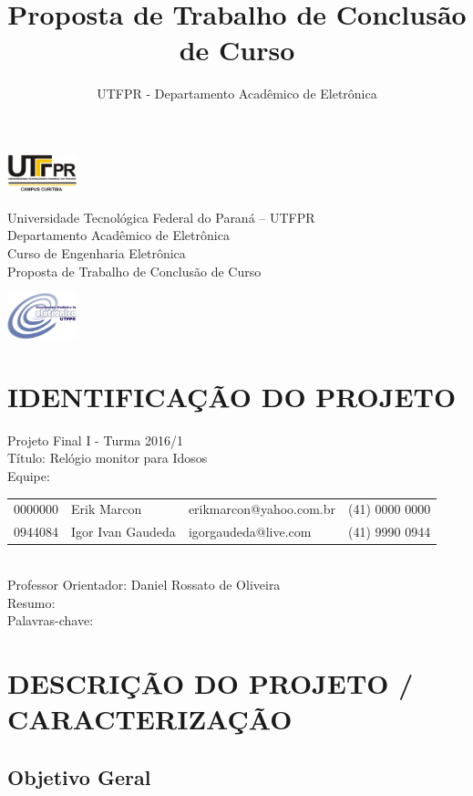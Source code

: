 \documentclass[a4paper]{article}
\title{Proposta de Trabalho de Conclusão de Curso}
\author{UTFPR - Departamento Acadêmico de Eletrônica}
\date{\the\year}
\begin{document}
\noindent
\includegraphics[width=0.15\textwidth]{figuras/UTFPR.png}
\begin{minipage}[b]{0.7\textwidth}
\centering
\Large{
Universidade Tecnológica Federal do Paraná – UTFPR\\
Departamento Acadêmico de Eletrônica\\
Curso de Engenharia Eletrônica \\
Proposta de Trabalho de Conclusão de Curso}
\end{minipage}
\includegraphics[width=0.15\textwidth]{figuras/daeln.jpg}

\section{IDENTIFICAÇÃO DO PROJETO}

Projeto Final I - Turma 2016/1 \\

Título: Relógio monitor para Idosos \\

Equipe:
\newline
	
\begin{tabular}{llll}
	0000000 & Erik Marcon & erikmarcon@yahoo.com.br & (41) 0000 0000 \\
	0944084 & Igor Ivan Gaudeda & igorgaudeda@live.com	 & (41) 9990 0944
\end{tabular} \\

Professor Orientador: Daniel Rossato de Oliveira \\

Resumo: \\

Palavras-chave: 

\section{DESCRIÇÃO DO PROJETO / CARACTERIZAÇÃO}

\subsection{Objetivo Geral}
\end{document}
